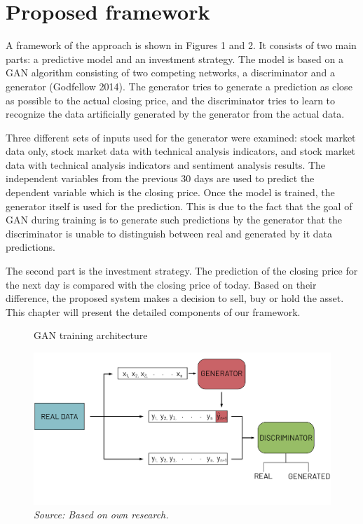 \documentclass[11pt]{article} %
\begin{document}
\section{Proposed framework}
A framework of the approach is shown in Figures 1 and 2. It consists of two main parts: a predictive model and an investment strategy. The model is based on a GAN algorithm consisting of two competing networks, a discriminator and a generator (Godfellow 2014). The generator tries to generate a prediction as close as possible to the actual closing price, and the discriminator tries to learn to recognize the data artificially generated by the generator from the actual data. 

Three different sets of inputs used for the generator were examined: stock market data only, stock market data with technical analysis indicators, and stock market data with technical analysis indicators and sentiment analysis results. The independent variables from the previous 30 days are used to predict the dependent variable which is the closing price. Once the model is trained, the generator itself is used for the prediction. This is due to the fact that the goal of GAN during training is to generate such predictions by the generator that the discriminator is unable to distinguish between real and generated by it data predictions.

The second part is the investment strategy. The prediction of the closing price for the next day is compared with the closing price of today. Based on their difference, the proposed system makes a decision to sell, buy or hold the asset. This chapter will present the detailed components of our framework. 

\begin{figure}[H]
\caption{GAN training architecture}
\includegraphics{rysunek1.png}
\caption*{\textit{Source: Based on own research.}}
\end{figure}
\end{document}
